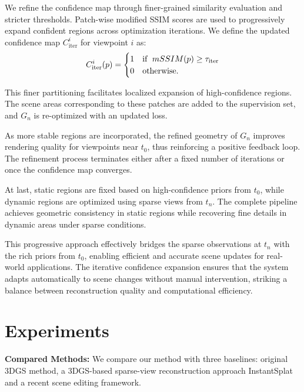 \documentclass[letterpaper]{article} %
\begin{document}
We refine the confidence map through finer-grained similarity evaluation and stricter thresholds. Patch-wise modified SSIM scores are used to progressively expand confident regions across optimization iterations. We define the updated confidence map \(C_{\text{iter}}^i\) for viewpoint \(i\) as:
%
\begin{equation}
C_{\text{iter}}^i(p) = \begin{cases} 
1 & \text{if \;} mSSIM(p) \geq \tau_{\text{iter}} \\ 
0 & \text{otherwise}.
\end{cases}
\end{equation}

This finer partitioning facilitates localized expansion of high-confidence regions. The scene areas corresponding to these patches are added to the supervision set, and \(G_n\) is re-optimized with an updated loss.

As more stable regions are incorporated, the refined geometry of \(G_n\) improves rendering quality for viewpoints near \(t_0\), thus reinforcing a positive feedback loop. 
The refinement process terminates either after a fixed number of iterations or once the confidence map converges. 

At last, static regions are fixed based on high-confidence priors from $t_0$, while dynamic regions are optimized using sparse views from $t_n$.
The complete pipeline achieves geometric consistency in static regions while recovering fine details in dynamic areas under sparse conditions.

This progressive approach effectively bridges the sparse observations at \(t_n\) with the rich priors from \(t_0\), enabling efficient and accurate scene updates for real-world applications. The iterative confidence expansion ensures that the system adapts automatically to scene changes without manual intervention, striking a balance between reconstruction quality and computational efficiency.

\section{Experiments}
\textbf{Compared Methods:}
We compare our method with three baselines: original 3DGS method, a 3DGS-based sparse-view reconstruction approach InstantSplat \cite{fan2024instantsplat} and a recent scene editing framework.
\end{document}
